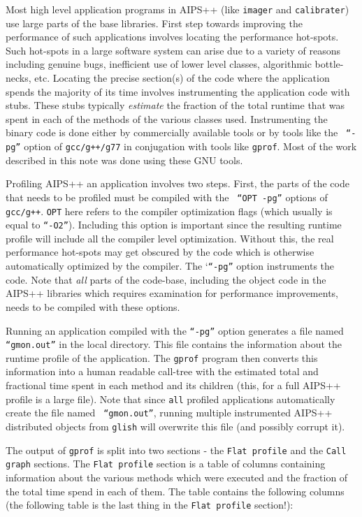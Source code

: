 Most high level application programs in AIPS++ (like {\tt imager} and
{\tt calibrater}) use large parts of the base libraries.  First step
towards improving the performance of such applications involves
locating the performance hot-spots.  Such hot-spots in a large
software system can arise due to a variety of reasons including
genuine bugs, inefficient use of lower level classes, algorithmic
bottle-necks, etc.  Locating the precise section(s) of the code where
the application spends the majority of its time involves instrumenting
the application code with stubs.  These stubs typically {\it estimate}
the fraction of the total runtime that was spent in each of the
methods of the various classes used.  Instrumenting the binary code is
done either by commercially available tools or by tools like the {\tt
``-pg''} option of {\tt gcc/g++/g77} in conjugation with tools like
{\tt gprof}.  Most of the work described in this note was done using
these GNU tools.

Profiling AIPS++ an application involves two steps.  First, the parts
of the code that needs to be profiled must be compiled with the {\tt
``OPT -pg''} options of {\tt gcc/g++}.  {\tt OPT} here refers to the
compiler optimization flags (which usually is equal to {\tt ``-O2''}).
Including this option is important since the resulting runtime profile
will include all the compiler level optimization.  Without this, the
real performance hot-spots may get obscured by the code which is
otherwise automatically optimized by the compiler.  The `{\tt ``-pg''}
option instruments the code.  Note that {\it all} parts of the
code-base, including the object code in the AIPS++ libraries which
requires examination for performance improvements, needs to be compiled
with these options.

Running an application compiled with the {\tt ``-pg''} option
generates a file named {\tt ``gmon.out''} in the local directory.
This file contains the information about the runtime profile of the
application.  The {\tt gprof} program then converts this information
into a human readable call-tree with the estimated total and
fractional time spent in each method and its children (this, for a
full AIPS++ profile is a large file).  Note that since {\tt all}
profiled applications automatically create the file named {\tt
``gmon.out''}, running multiple instrumented AIPS++ distributed
objects from {\tt glish} will overwrite this file (and possibly
corrupt it).

The output of {\tt gprof} is split into two sections - the {\tt Flat
profile} and the {\tt Call graph} sections.  The {\tt Flat profile}
section is a table of columns containing information about the various
methods which were executed and the fraction of the total time spend in
each of them.  The table contains the following columns (the following
table is the last thing in the {\tt Flat profile} section!):

